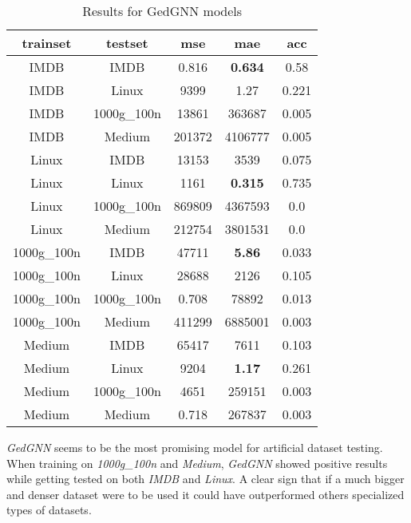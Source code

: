 \documentclass[../Thesis.tex]{subfiles}
\begin{document}
	\begin{table}[H]
		\centering
		\setlength\tabcolsep{4pt}
		\renewcommand{\arraystretch}{1.2}
		\begin{tabular}{c|c|c|c|c}
			\toprule
			\textbf{trainset} & \textbf{testset} & \textbf{mse} & \textbf{mae} & \textbf{acc} \\
			\midrule
			IMDB & IMDB & 0.816 & \textbf{0.634} & 0.58 \\
			IMDB & Linux & 9399 & 1.27 & 0.221 \\
			IMDB & 1000g\_100n & 13861 & 363687 & 0.005 \\
			IMDB & Medium & 201372 & 4106777 & 0.005 \\ \midrule
			Linux & IMDB & 13153 & 3539 & 0.075 \\
			Linux & Linux & 1161 & \textbf{0.315} & 0.735 \\
			Linux & 1000g\_100n & 869809 & 4367593 & 0.0 \\
			Linux & Medium & 212754 & 3801531 & 0.0 \\ \midrule
			1000g\_100n & IMDB & 47711 & \textbf{5.86} & 0.033 \\
			1000g\_100n & Linux & 28688 & 2126 & 0.105 \\
			1000g\_100n & 1000g\_100n & 0.708 & 78892 & 0.013 \\
			1000g\_100n & Medium & 411299 & 6885001 & 0.003 \\ \midrule
			Medium & IMDB & 65417 & 7611 & 0.103 \\
			Medium & Linux & 9204 & \textbf{1.17} & 0.261 \\
			Medium & 1000g\_100n & 4651 & 259151 & 0.003 \\
			Medium & Medium & 0.718 & 267837 & 0.003 \\
			\bottomrule
		\end{tabular}
		\caption{Results for GedGNN models}
		\label{table:gedgnn}
	\end{table}	
	
	\emph{GedGNN} seems to be the most promising model for artificial dataset testing. When training on \emph{1000g\_100n} and \emph{Medium}, \emph{GedGNN} showed positive results while getting tested on both \emph{IMDB} and \emph{Linux}. A clear sign that if a much bigger and denser dataset were to be used it could have outperformed others specialized types of datasets.

	
\end{document}
